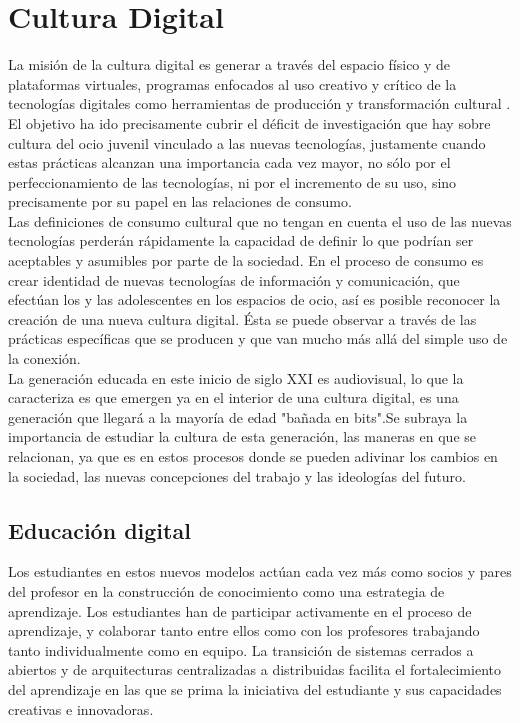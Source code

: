 \section{Cultura Digital}
La misión de la cultura digital es generar a través del espacio físico y de plataformas virtuales, programas enfocados al uso creativo y crítico de la tecnologías digitales como herramientas de producción y transformación cultural \cite{vid08}. El objetivo ha ido precisamente cubrir el déficit de investigación que hay sobre cultura del ocio juvenil vinculado a las nuevas tecnologías, justamente cuando estas prácticas alcanzan una importancia cada vez mayor, no sólo por el perfeccionamiento de las tecnologías, ni por el incremento de su uso, sino precisamente por su papel en las relaciones de consumo.
\\[1pt] 

Las definiciones de consumo cultural que no tengan en cuenta el uso de las nuevas tecnologías perderán rápidamente la capacidad de definir lo que podrían ser aceptables y asumibles por parte de la sociedad. En el proceso de consumo es crear identidad de nuevas tecnologías de información y comunicación, que efectúan los y las adolescentes en los espacios de ocio, así es posible reconocer la creación de una nueva cultura digital. Ésta se puede observar a través de las prácticas específicas que se producen y que van mucho más allá del simple uso de la conexión.
\\[1pt]

La generación educada en este inicio de siglo XXI es audiovisual, lo que la caracteriza es que emergen ya en el interior de una cultura digital, es una generación que llegará a la mayoría de edad "bañada en bits".Se subraya la importancia de estudiar la cultura de esta generación, las maneras en que se relacionan, ya que es en estos procesos donde se pueden adivinar los cambios en la sociedad, las nuevas concepciones del trabajo y las ideologías del futuro.
\\[1pt]

\subsection{Educación digital}
Los estudiantes en estos nuevos modelos actúan cada vez más como socios y pares del profesor en la construcción de conocimiento como una estrategia de aprendizaje. Los estudiantes han de participar activamente en el proceso de aprendizaje, y colaborar tanto entre ellos como con los profesores trabajando tanto individualmente como en equipo. La transición de sistemas cerrados a abiertos y de arquitecturas centralizadas a distribuidas facilita el fortalecimiento del aprendizaje en las que se prima la iniciativa del estudiante y sus capacidades creativas e innovadoras.
\\[1pt] 

